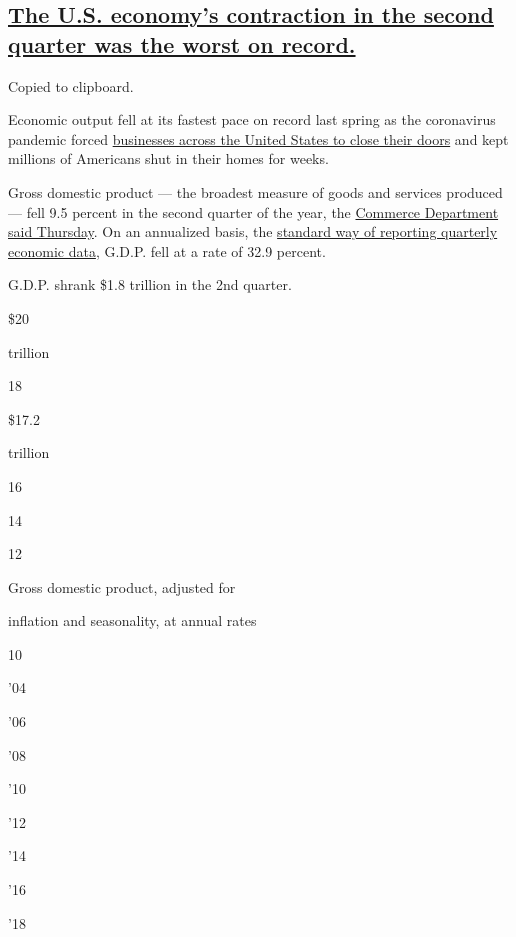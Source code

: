 \hypertarget{the-us-economys-contraction-in-the-second-quarter-was-the-worst-on-record}{%
\subsection{\texorpdfstring{\protect\hyperlink{the-us-economys-contraction-in-the-second-quarter-was-the-worst-on-record}{The
U.S. economy's contraction in the second quarter was the worst on
record.}}{The U.S. economy's contraction in the second quarter was the worst on record.}}\label{the-us-economys-contraction-in-the-second-quarter-was-the-worst-on-record}}

Copied to clipboard.

Economic output fell at its fastest pace on record last spring as the
coronavirus pandemic forced
\href{https://www.nytimes3xbfgragh.onion/2020/07/17/business/economy/how-to-save-economy.html?action=click\&module=RelatedLinks\&pgtype=Article}{businesses
across the United States to close their doors} and kept millions of
Americans shut in their homes for weeks.

Gross domestic product --- the broadest measure of goods and services
produced --- fell 9.5 percent in the second quarter of the year, the
\href{https://www.bea.gov/sites/default/files/2020-07/gdp2q20_adv.pdf}{Commerce
Department said Thursday}. On an annualized basis, the
\href{https://www.nytimes3xbfgragh.onion/2020/07/29/business/economy/us-gdp-report.html}{standard
way of reporting quarterly economic data}, G.D.P. fell at a rate of 32.9
percent.

G.D.P. shrank \$1.8 trillion in the 2nd quarter.

\$20

trillion

18

\$17.2

trillion

16

14

12

Gross domestic product, adjusted for

inflation and seasonality, at annual rates

10

'04

'06

'08

'10

'12

'14

'16

'18

